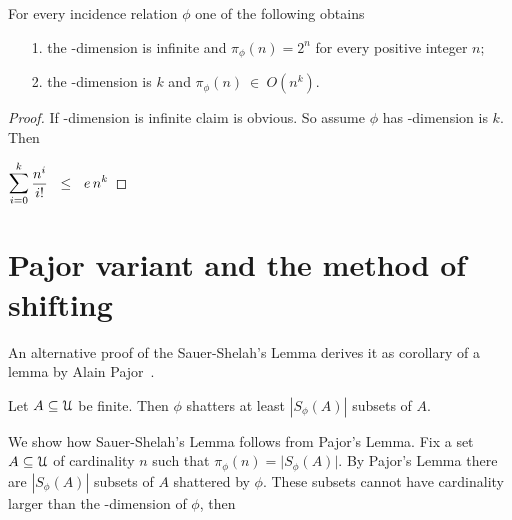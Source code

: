 \documentclass[sputnik.tex]{subfiles}
\begin{document}
\begin{corollary}\label{coroll_Sauer}
For every incidence relation $\phi$ one of the following obtains
\begin{itemize}
 \item[1.] the \vc-dimension is infinite and $\pi_\phi(n)=2^n$ for every positive integer $n$;
 \item[2.] the \vc-dimension is $k$ and $\pi_\phi(n)\ \in\ O(n^k)$.
\end{itemize}
\end{corollary}
\begin{proof}
If \vc-dimension is infinite claim  is obvious.
So assume $\phi$ has \vc-dimension is $k$.
Then

\medrel{\le}$\displaystyle\bigsum^k_{i=0}\frac{n^i}{i!}\medrel{\le}e\,n^k$%
\end{proof}

% 

\section{Pajor variant and the method of shifting}

An alternative proof of the Sauer-Shelah's Lemma derives it as corollary of a lemma by Alain Pajor~\cite{pajor}.

\begin{proposition}\label{prop_Pajor}
Let $A\subseteq\EuScript U$ be finite.
Then $\phi$ shatters at least $|S_\phi(A)|$ subsets of $A$.
\end{proposition}

We show how Sauer-Shelah's Lemma follows from Pajor's Lemma.
Fix a set $A\subseteq\EuScript U$ of cardinality $n$ such that $\pi_\phi(n)=\big|S_\phi(A)\big|$.
By Pajor's Lemma there are $|S_\phi(A)|$ subsets of $A$ shattered by $\phi$.
These subsets cannot have cardinality larger than the \vc-dimension of $\phi$, then 

\end{document}
